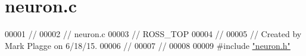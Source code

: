 \hypertarget{neuron_8c_source}{}\section{neuron.\+c}
\label{neuron_8c_source}

\begin{DoxyCode}
00001 \textcolor{comment}{//}
00002 \textcolor{comment}{//  neuron.c}
00003 \textcolor{comment}{//  ROSS\_TOP}
00004 \textcolor{comment}{//}
00005 \textcolor{comment}{//  Created by Mark Plagge on 6/18/15.}
00006 \textcolor{comment}{//}
00007 \textcolor{comment}{//}
00008 
00009 \textcolor{preprocessor}{#}\textcolor{preprocessor}{include} \hyperlink{neuron_8h}{"neuron.h"}
\end{DoxyCode}
